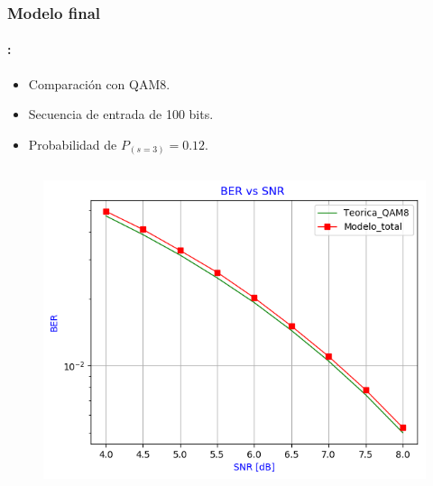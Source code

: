 \begin{frame}
  \frametitle{\textbf{Modelo final}}
\framesubtitle{\secname : \subsecname}
      \begin{block}{}
        \begin{itemize}
            \item Comparación con QAM8. 
            \item Secuencia de entrada de 100 bits.
            \item Probabilidad de $P_{(s=3)} = 0.12$.
     \end{itemize}  
     \end{block}
    \vspace{-0.3cm}

\begin{columns}
    
    \begin{column}{0.48\paperwidth}  
    \begin{figure}
        \centering
        \includegraphics[width=\textwidth]{Graficos/BER_vs_SNR_6.png}
        \label{fig:my_label}
    \end{figure}
    \end{column}
    

\end{columns}
\end{frame}

